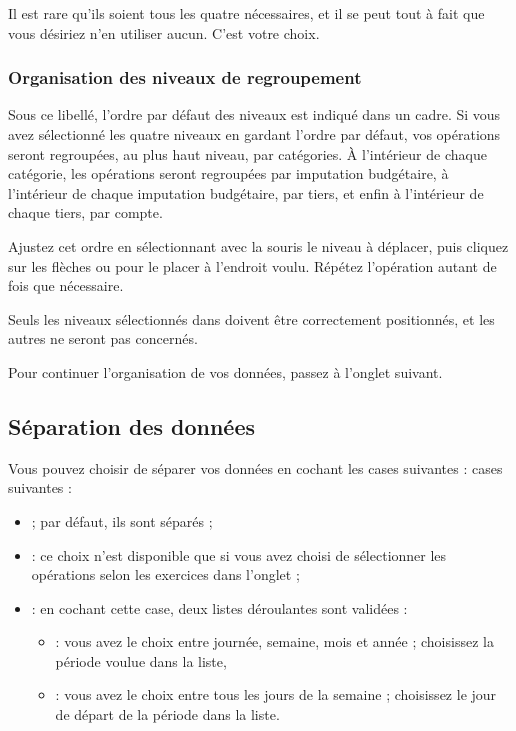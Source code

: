 Il est rare qu'ils soient tous les quatre nécessaires, et il se peut tout à fait que vous désiriez n'en utiliser aucun. C'est votre choix. 


\subsubsection{Organisation des niveaux de regroupement\label{reportscreation-organisation-group-levels}}

Sous ce libellé, l'ordre par défaut des niveaux est indiqué dans un cadre. Si vous avez sélectionné les quatre niveaux en gardant l'ordre par défaut, vos opérations seront regroupées, au plus haut niveau, par catégories. À l'intérieur de chaque catégorie, les opérations seront regroupées par imputation budgétaire, à l'intérieur de chaque imputation budgétaire, par tiers, et enfin à l'intérieur de chaque tiers, par compte.

Ajustez cet ordre en sélectionnant  avec la souris le niveau à déplacer, puis cliquez sur les flèches  ou  pour le placer à l'endroit voulu. Répétez l'opération autant de fois que nécessaire.

Seuls les niveaux sélectionnés dans  doivent être correctement positionnés, et les autres ne seront pas concernés.

Pour continuer l'organisation de vos données, passez à l'onglet suivant.


\subsection{Séparation des données\label{reportscreation-organisation-separation}}

Vous pouvez choisir de séparer vos données en cochant les \ifIllustration cases suivantes :
\else cases suivantes :
\fi

\begin{itemize}
	\item {} ; par défaut, ils sont séparés ;
	\item {} : ce choix n'est disponible que si vous avez choisi de sélectionner les opérations selon les exercices dans l'onglet  ;
	\item {} : en cochant cette case, deux listes déroulantes sont validées :
		\begin{itemize}
			\item {} : vous avez le choix entre journée, semaine, mois et année ; choisissez la période voulue dans la liste,
			\item {} :  vous avez le choix entre tous les jours de la semaine ; choisissez le jour de départ de la période dans la liste.
		\end{itemize} 
\end{itemize} 

